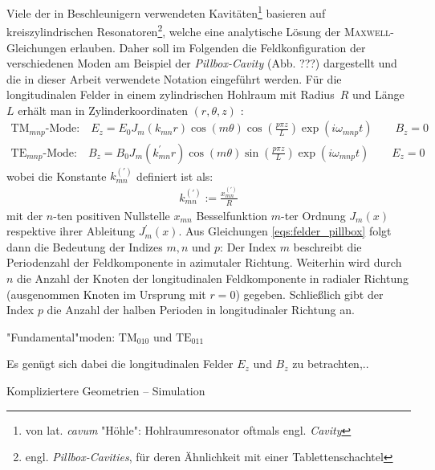 \documentclass[11pt, a4paper]{scrbook}
\begin{document}
	Viele der in Beschleunigern verwendeten Kavitäten\footnote{von lat. \emph{cavum} "Höhle": Hohlraumresonator oftmals engl. \emph{Cavity}} basieren auf kreiszylindrischen Resonatoren\footnote{engl. \emph{Pillbox-Cavities}, für deren Ähnlichkeit mit einer Tablettenschachtel}, welche eine analytische Lösung der \textsc{Maxwell}-Gleichungen erlauben.
	Daher soll im Folgenden die Feldkonfiguration der verschiedenen Moden am Beispiel der \emph{Pillbox-Cavity} (Abb. ???) dargestellt und die in dieser Arbeit verwendete Notation eingeführt werden.
	Für die longitudinalen Felder in einem zylindrischen Hohlraum mit Radius~$R$ und Länge~$L$ erhält man in Zylinderkoordinaten $(r, \theta, z)$ \cite{wangler}:
	\begin{subequations}
		\begin{align}
		\mathrm{TM}_{mnp}\text{-Mode:} \quad E_z = E_0 J_m(k_{mn} r) \cos(m \theta) \cos\left(\frac{p \pi z}{L}\right) \exp(i \omega_{mnp} t) \qquad B_z = 0\\
		\mathrm{TE}_{mnp}\text{-Mode:} \quad B_z = B_0 J_m(k_{mn}^\prime r) \cos(m \theta) \sin\left(\frac{p \pi z}{L}\right) \exp(i \omega_{mnp} t) \qquad  E_z = 0
		\end{align}
		\label{eqs:felder_pillbox}
	\end{subequations}
	wobei die Konstante $k_{mn}^{(\prime)}$ definiert ist als:
	\begin{align}
	k_{mn}^{(\prime)} := \frac{x_{mn}^{(\prime)}}{R}
	\end{align}
	mit der $n$-ten positiven Nullstelle $x_{mn}$ Besselfunktion $m$-ter Ordnung $J_m(x)$ respektive ihrer Ableitung $J_m^\prime(x)$.
	Aus Gleichungen \eqref{eqs:felder_pillbox} folgt dann die Bedeutung der Indizes $m, n$ und $p$:
	Der Index $m$ beschreibt die Periodenzahl der Feldkomponente in azimutaler Richtung.
	Weiterhin wird durch $n$ die Anzahl der Knoten der longitudinalen Feldkomponente in radialer Richtung (ausgenommen Knoten im Ursprung mit $r=0$) gegeben.
	Schließlich gibt der Index $p$ die Anzahl der halben Perioden in longitudinaler Richtung an.
	
	"Fundamental"moden: $\mathrm{TM}_{010}$ und $\mathrm{TE}_{011}$
	
	
	
	Es genügt sich dabei die longitudinalen Felder $E_z$ und $B_z$ zu betrachten,..
	
	Kompliziertere Geometrien -- Simulation
	
\end{document}
